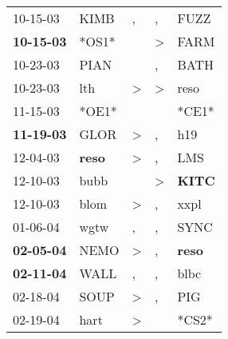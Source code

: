 \begin{supertabular}{p{0.07\textwidth}p{0.06\textwidth}p{0.02\textwidth}p{0.02\textwidth}p{0.06\textwidth}}
          10-15-03\textsuperscript{} &           KIMB\textsuperscript{} &                , &                , &           FUZZ\textsuperscript{} \\
 \textbf{10-15-03\textsuperscript{}} &                            *OS1* &                  &     \textgreater &           FARM\textsuperscript{} \\
          10-23-03\textsuperscript{} &           PIAN\textsuperscript{} &                  &                , &           BATH\textsuperscript{} \\
          10-23-03\textsuperscript{} &            lth\textsuperscript{} &     \textgreater &     \textgreater &           reso\textsuperscript{} \\
          11-15-03\textsuperscript{} &                            *OE1* &                  &                  &                            *CE1* \\
 \textbf{11-19-03\textsuperscript{}} &           GLOR\textsuperscript{} &     \textgreater &                , &            h19\textsuperscript{} \\
          12-04-03\textsuperscript{} &  \textbf{reso\textsuperscript{}} &     \textgreater &                , &            LMS\textsuperscript{} \\
          12-10-03\textsuperscript{} &           bubb\textsuperscript{} &                  &     \textgreater &  \textbf{KITC\textsuperscript{}} \\
          12-10-03\textsuperscript{} &           blom\textsuperscript{} &     \textgreater &                , &           xxpl\textsuperscript{} \\
          01-06-04\textsuperscript{} &           wgtw\textsuperscript{} &                , &                , &           SYNC\textsuperscript{} \\
 \textbf{02-05-04\textsuperscript{}} &           NEMO\textsuperscript{} &     \textgreater &                , &  \textbf{reso\textsuperscript{}} \\
 \textbf{02-11-04\textsuperscript{}} &           WALL\textsuperscript{} &                , &                , &           blbc\textsuperscript{} \\
          02-18-04\textsuperscript{} &           SOUP\textsuperscript{} &     \textgreater &                , &            PIG\textsuperscript{} \\
          02-19-04\textsuperscript{} &           hart\textsuperscript{} &     \textgreater &                  &                            *CS2* \\

\end{supertabular}
